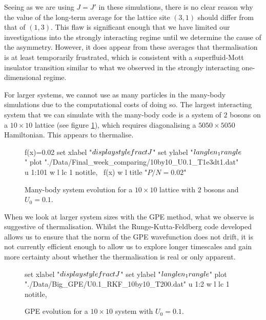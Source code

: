 \documentclass[a4paper, 10pt]{article}
\theoremstyle{plain}
\begin{document}
Seeing as we are using $J=J'$ in these simulations, there is no clear reason
why the value of the long-term average for the lattice site $(3,1)$ should
differ from that of $(1,3)$. This flaw is significant enough that we have
limited our investigations into the strongly interacting regime until we
determine the cause of the asymmetry. However, it does appear from these
averages that thermalisation is at least temporarily frustrated, which is
consistent with a superfluid-Mott insulator transition similar to what we
observed in the strongly interacting one-dimensional regime.

For larger systems, we cannot use as many particles in the many-body simulations
due to the computational costs of doing so. The largest interacting system
that we can simulate with the many-body code is a system of $2$ bosons on
a $10\times10$ lattice (see figure \ref{10by10_analyticU0.1}),
which requires diagonalising a $5050\times5050$ Hamiltonian. This appears to
thermalise.

\begin{figure}[H]
    \centering
    \begin{gnuplot}[terminal=cairolatex, terminaloptions={lw 2}, scale=0.95]
	f(x)=0.02
        set xlabel "$\\displaystyle \\frac{t}{J}$"
        set ylabel "$\\langle n_{1} \\rangle$"
        plot "./Data/Final_week_comparing/10by10_U0.1_T1e3dt1.dat" u 1:101 w l lc 1 notitle, \
        f(x) w l title "$P/N=0.02$"
     \end{gnuplot}
     \vspace*{-5mm}
     \caption{\label{10by10_analyticU0.1}
	      Many-body system evolution for a $10\times10$ lattice with $2$
     bosons and $U_0=0.1$.}
\end{figure}

When we look at larger system sizes with the GPE method, what we observe is
suggestive of thermalisation. Whilst the Runge-Kutta-Feldberg code developed
allows us to ensure that the norm of the GPE wavefunction does not drift, it is
not currently efficient enough to allow us to explore longer timescales and
gain more certainty about whether the thermalisation is real or only apparent.

\begin{figure}[H]
    \centering
    \begin{gnuplot}[terminal=cairolatex, terminaloptions={lw 2}, scale=0.95]
        set xlabel "$\\displaystyle \\frac{t}{J}$"
        set ylabel "$\\langle n_{1} \\rangle$"
        plot "./Data/Big_GPE/U0.1_RKF_10by10_T200.dat" u 1:2 w l lc 1 notitle,
     \end{gnuplot}
     \vspace*{-5mm}
     \caption{GPE evolution for a $10\times10$ system with $U_0=0.1$.}
\end{figure}
\end{document}
